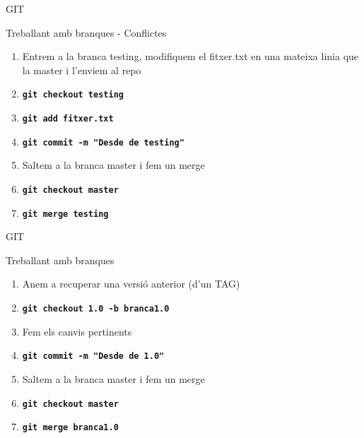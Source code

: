 \documentclass[10pt,xcolor={rgb}]{beamer}
\begin{document}
    \begin{frame}[fragile]{GIT}
      \begin{block}{Treballant amb branques - Conflictes}

        \begin{enumerate}
          \item Entrem a la branca testing, modifiquem el fitxer.txt en una mateixa linia que la master i l'enviem al repo
          \item \texttt{\textbf{git checkout testing}}
          \item \texttt{\textbf{git add fitxer.txt}}
          \item \texttt{\textbf{git commit -m "Desde de testing"}}
          \item Saltem a la branca master i fem un merge
          \item \texttt{\textbf{git checkout master}}
          \item \texttt{\textbf{git merge testing}}
        \end{enumerate}

      \end{block}
    \end{frame}

    \begin{frame}[fragile]{GIT}
      \begin{block}{Treballant amb branques}

        \begin{enumerate}
          \item Anem a recuperar una versió anterior (d'un TAG)
          \item \texttt{\textbf{git checkout 1.0 -b branca1.0}}
          \item Fem els canvis pertinents
          \item \texttt{\textbf{git commit -m "Desde de 1.0"}}
          \item Saltem a la branca master i fem un merge
          \item \texttt{\textbf{git checkout master}}
          \item \texttt{\textbf{git merge branca1.0}}
        \end{enumerate}

      \end{block}
    \end{frame}
\end{document}
